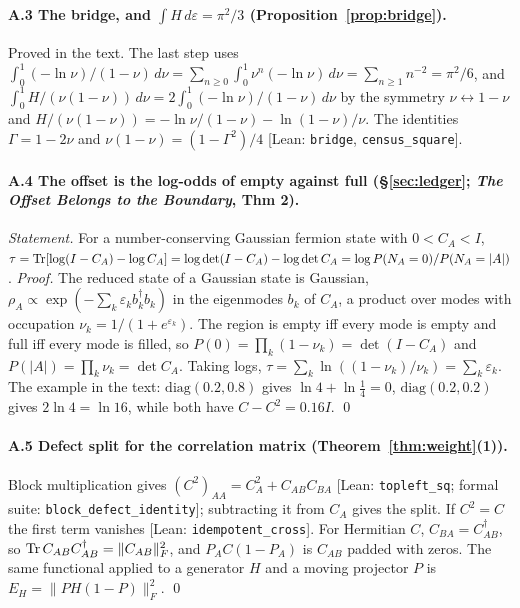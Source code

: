 \paragraph{A.3 The bridge, and $\int H\,d\varepsilon=\pi^2/3$ (Proposition~\ref{prop:bridge}).}
Proved in the text. The last step uses $\int_0^1(-\ln\nu)/(1-\nu)\,d\nu=\sum_{n\ge0}\int_0^1\nu^n(-\ln\nu)\,d\nu=\sum_{n\ge1}n^{-2}=\pi^2/6$, and $\int_0^1H/(\nu(1-\nu))\,d\nu=2\int_0^1(-\ln\nu)/(1-\nu)\,d\nu$ by the symmetry $\nu\leftrightarrow1-\nu$ and $H/(\nu(1-\nu))=-\ln\nu/(1-\nu)-\ln(1-\nu)/\nu$. The identities $\Gamma=1-2\nu$ and $\nu(1-\nu)=(1-\Gamma^2)/4$ \textsf{[Lean: \texttt{bridge}, \texttt{census\_square}]}.

\paragraph{A.4 The offset is the log-odds of empty against full (§\ref{sec:ledger}; \emph{The Offset Belongs to the Boundary}, Thm 2).}
\emph{Statement.} For a number-conserving Gaussian fermion state with $0<C_A<I$, $\tau=\operatorname{Tr}[\log(I-C_A)-\log C_A]=\log\det(I-C_A)-\log\det C_A=\log P(N_A=0)/P(N_A=|A|)$.
\emph{Proof.} The reduced state of a Gaussian state is Gaussian, $\rho_A\propto\exp(-\sum_k\varepsilon_kb_k^\dagger b_k)$ in the eigenmodes $b_k$ of $C_A$, a product over modes with occupation $\nu_k=1/(1+e^{\varepsilon_k})$. The region is empty iff every mode is empty and full iff every mode is filled, so $P(0)=\prod_k(1-\nu_k)=\det(I-C_A)$ and $P(|A|)=\prod_k\nu_k=\det C_A$. Taking logs, $\tau=\sum_k\ln((1-\nu_k)/\nu_k)=\sum_k\varepsilon_k$. The example in the text: $\mathrm{diag}(0.2,0.8)$ gives $\ln4+\ln\tfrac14=0$, $\mathrm{diag}(0.2,0.2)$ gives $2\ln4=\ln16$, while both have $C-C^2=0.16I$. \qed

\paragraph{A.5 Defect split for the correlation matrix (Theorem~\ref{thm:weight}(1)).}
Block multiplication gives $(C^2)_{AA}=C_A^2+C_{AB}C_{BA}$ \textsf{[Lean: \texttt{topleft\_sq}; formal suite: \texttt{block\_defect\_identity}]}; subtracting it from $C_A$ gives the split. If $C^2=C$ the first term vanishes \textsf{[Lean: \texttt{idempotent\_cross}]}. For Hermitian $C$, $C_{BA}=C_{AB}^\dagger$, so $\operatorname{Tr} C_{AB}C_{AB}^\dagger=\|C_{AB}\|_F^2$, and $P_AC(1-P_A)$ is $C_{AB}$ padded with zeros. The same functional applied to a generator $H$ and a moving projector $P$ is $E_H=\|PH(1-P)\|_F^2$. \qed

